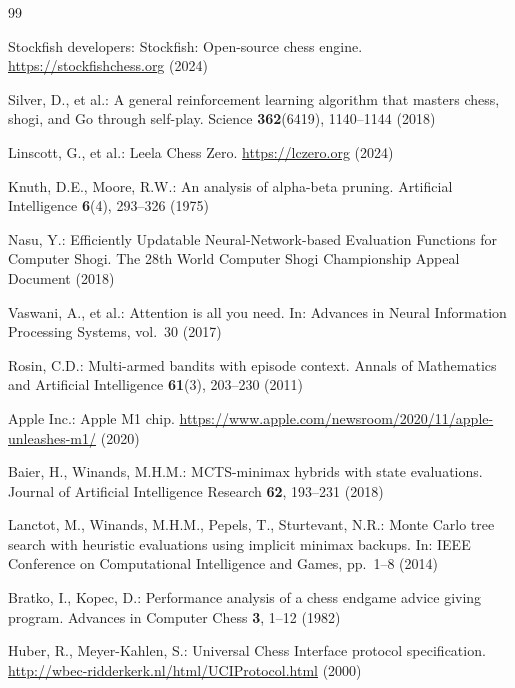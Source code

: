 \documentclass{svproc}
\begin{document}
\newpage
\begin{thebibliography}{99}

Stockfish developers: Stockfish: Open-source chess engine. \url{https://stockfishchess.org} (2024)

Silver, D., et al.: A general reinforcement learning algorithm that masters chess, shogi, and Go through self-play. Science \textbf{362}(6419), 1140--1144 (2018)

Linscott, G., et al.: Leela Chess Zero. \url{https://lczero.org} (2024)

Knuth, D.E., Moore, R.W.: An analysis of alpha-beta pruning. Artificial Intelligence \textbf{6}(4), 293--326 (1975)

Nasu, Y.: Efficiently Updatable Neural-Network-based Evaluation Functions for Computer Shogi. The 28th World Computer Shogi Championship Appeal Document (2018)

Vaswani, A., et al.: Attention is all you need. In: Advances in Neural Information Processing Systems, vol.~30 (2017)

Rosin, C.D.: Multi-armed bandits with episode context. Annals of Mathematics and Artificial Intelligence \textbf{61}(3), 203--230 (2011)

Apple Inc.: Apple M1 chip. \url{https://www.apple.com/newsroom/2020/11/apple-unleashes-m1/} (2020)

Baier, H., Winands, M.H.M.: MCTS-minimax hybrids with state evaluations. Journal of Artificial Intelligence Research \textbf{62}, 193--231 (2018)

Lanctot, M., Winands, M.H.M., Pepels, T., Sturtevant, N.R.: Monte Carlo tree search with heuristic evaluations using implicit minimax backups. In: IEEE Conference on Computational Intelligence and Games, pp.~1--8 (2014)

Bratko, I., Kopec, D.: Performance analysis of a chess endgame advice giving program. Advances in Computer Chess \textbf{3}, 1--12 (1982)

Huber, R., Meyer-Kahlen, S.: Universal Chess Interface protocol specification. \url{http://wbec-ridderkerk.nl/html/UCIProtocol.html} (2000)


\end{thebibliography}
\end{document}
